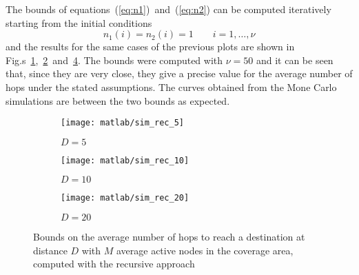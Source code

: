\documentclass[a4paper,oneside]{article}
\begin{document}
  The bounds of equations~(\ref{eq:n1})~and~(\ref{eq:n2}) can be
  computed iteratively starting from the initial conditions
  \begin{equation}
    n_1(i) = n_2(i) = 1 \qquad i = 1, \dots, \nu 
  \end{equation}
  and the results for the same cases of the previous plots are shown
  in
  Fig.s~\ref{plot:geraf_rec_5},~\ref{plot:geraf_rec_10}~and~\ref{plot:geraf_rec_20}. The
  bounds were computed with $\nu = 50$ and it can be seen that, since
  they are very close, they give a precise value for the average
  number of hops under the stated assumptions.
%
  The curves obtained from the Mone Carlo simulations are between the
  two bounds as expected.
\begin{figure}[htbp]
  \centering
  \begin{subfigure}{0.5\textwidth}
    \centering
    \texttt{[image: matlab/sim\_rec\_5]}
    \caption{$ D = 5 $}
    \label{plot:geraf_rec_5}
  \end{subfigure}%
  \begin{subfigure}{0.5\textwidth}
    \centering
    \texttt{[image: matlab/sim\_rec\_10]}
    \caption{$ D = 10 $}
    \label{plot:geraf_rec_10}
  \end{subfigure}
  \begin{subfigure}{0.5\textwidth}
    \centering
    \texttt{[image: matlab/sim\_rec\_20]}
    \caption{$ D = 20 $}
    \label{plot:geraf_rec_20}
  \end{subfigure}
  \caption{Bounds on the average number of hops to reach a destination
    at distance $D$ with $M$ average active nodes in the coverage
    area, computed with the recursive approach}
\end{figure}
\end{document}
